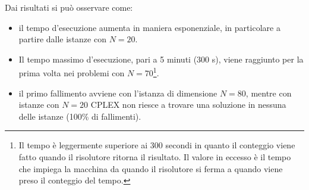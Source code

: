 Dai risultati si può osservare come:
\begin{itemize}
	\item il tempo d'esecuzione aumenta in maniera esponenziale, in particolare a partire dalle istanze con $N=20$.
	\item Il tempo massimo d'esecuzione, pari a 5 minuti (300 s), viene raggiunto per la prima volta
	nei problemi con $N=70$\footnote{Il tempo è leggermente superiore ai 300 secondi in quanto il conteggio viene fatto
	quando il risolutore ritorna il risultato. Il valore in eccesso è il tempo che impiega la macchina
	da quando il risolutore si ferma a quando viene preso il conteggio del tempo.}.
	\item il primo fallimento avviene con l'istanza di dimensione $N=80$, mentre con istanze con $N=20$ CPLEX
	non riesce a trovare una soluzione in nessuna delle istanze (100\% di fallimenti).
\end{itemize}
%
